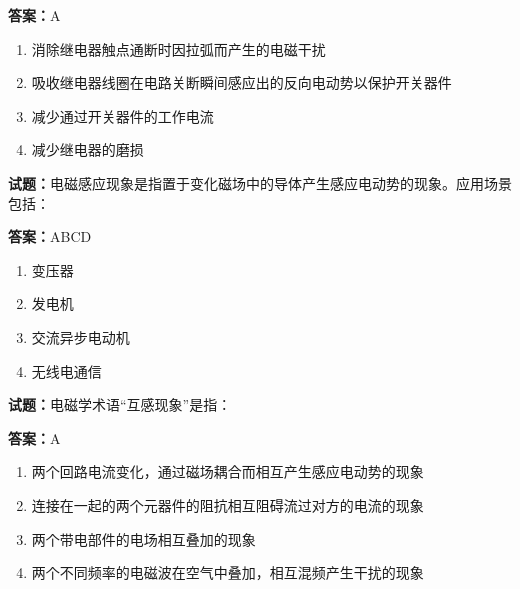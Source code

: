 \documentclass{ctexbook}
\begin{document}
\textbf{答案：}A 

\begin{enumerate}[leftmargin=3em]
  \item 消除继电器触点通断时因拉弧而产生的电磁干扰 


  \item 吸收继电器线圈在电路关断瞬间感应出的反向电动势以保护开关器件 

  \item 减少通过开关器件的工作电流 

  \item 减少继电器的磨损 

\end{enumerate}





\vspace{1em}

\textbf{试题：}电磁感应现象是指置于变化磁场中的导体产生感应电动势的现象。应用场景包括： 

\textbf{答案：}ABCD 

\begin{enumerate}[leftmargin=3em]
  \item 变压器 

  \item 发电机 

  \item 交流异步电动机 

  \item 无线电通信 

\end{enumerate}





\vspace{1em}

\textbf{试题：}电磁学术语“互感现象”是指： 

\textbf{答案：}A 

\begin{enumerate}[leftmargin=3em]
  \item 两个回路电流变化，通过磁场耦合而相互产生感应电动势的现象 

  \item 连接在一起的两个元器件的阻抗相互阻碍流过对方的电流的现象 

  \item 两个带电部件的电场相互叠加的现象 

  \item 两个不同频率的电磁波在空气中叠加，相互混频产生干扰的现象 

\end{enumerate}
\end{document}
